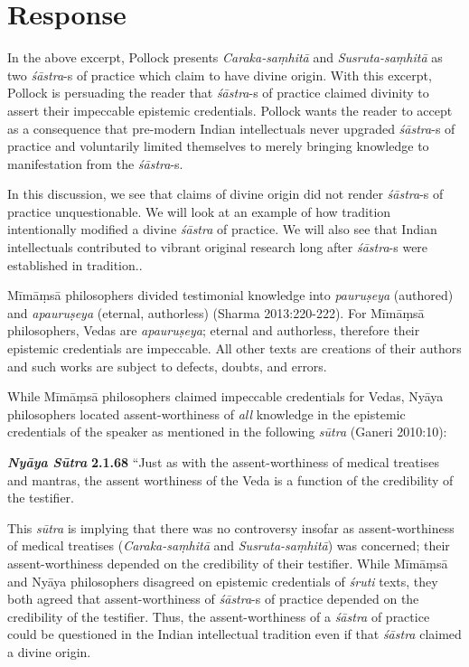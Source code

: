 \section*{Response}

In the above excerpt, Pollock presents {\sl Caraka-saṃhitā} and {\sl Susruta-saṃhitā} as two {\sl śāstra}-s of practice which claim to have divine origin.  With this excerpt, Pollock is persuading the reader that {\sl śāstra}-s of practice claimed divinity to assert their impeccable epistemic credentials. Pollock wants the reader to accept as a consequence that pre-modern Indian intellectuals never upgraded {\sl śāstra}-s of practice and voluntarily limited themselves to merely bringing knowledge to manifestation from the {\sl śāstra}-s.

In this discussion, we see that claims of divine origin did not render {\sl śāstra}-s of practice unquestionable. We will look at an example of how tradition intentionally modified a divine {\sl śāstra} of practice. We will also see that Indian intellectuals contributed to vibrant original research long after {\sl śāstra}-s were established in tradition..


Mīmāṃsā philosophers divided testimonial knowledge into {\sl pauruṣeya} (authored) and {\sl apauruṣeya} (eternal, authorless) (Sharma 2013:220-222). For Mīmāṃsā philosophers, Vedas are {\sl apauruṣeya}; eternal and authorless, therefore their epistemic credentials are impeccable. All other texts are creations of their authors and such works are subject to defects, doubts, and errors.

While Mīmāṃsā philosophers claimed impeccable credentials for Vedas, Nyāya philosophers located assent-worthiness of {\sl all} knowledge in the epistemic credentials of the speaker as mentioned in the following {\sl sūtra} (Ganeri 2010:10):
\begin{myquote}
{{\sl\bfseries Nyāya Sūtra}\relax}  {\bf 2.1.68} ``Just as with the assent-worthiness of medical treatises and mantras, the assent worthiness of the Veda is a function of the credibility of the testifier.
\end{myquote}

This {\sl sūtra} is implying that there was no controversy insofar as assent-worthiness of medical treatises ({\sl Caraka-saṃhitā} and {\sl Susruta-saṃhitā}) was concerned; their assent-worthiness depended on the credibility of their testifier. While Mīmāṃsā and Nyāya philosophers disagreed on epistemic credentials of {\sl śruti} texts, they both agreed that assent-worthiness of {\sl śāstra}-s of practice depended on the credibility of the testifier. Thus, the assent-worthiness of a {\sl śāstra} of practice could be questioned in the Indian intellectual tradition even if that {\sl śāstra} claimed a divine origin.

